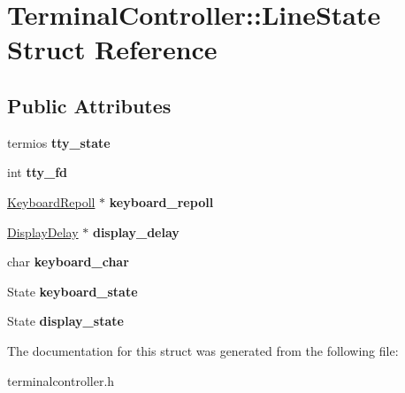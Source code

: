 \hypertarget{structTerminalController_1_1LineState}{
\section{TerminalController::LineState Struct Reference}
\label{structTerminalController_1_1LineState}
}
\subsection*{Public Attributes}
\begin{DoxyCompactItemize}
\item 
\hypertarget{structTerminalController_1_1LineState_aa3d5368683cf0c21a6eb4d995a7a0d76}{
termios {\bfseries tty\_\-state}}
\label{structTerminalController_1_1LineState_aa3d5368683cf0c21a6eb4d995a7a0d76}

\item 
\hypertarget{structTerminalController_1_1LineState_aa6ed05eb943bb04a902a0c10cbb4c98b}{
int {\bfseries tty\_\-fd}}
\label{structTerminalController_1_1LineState_aa6ed05eb943bb04a902a0c10cbb4c98b}

\item 
\hypertarget{structTerminalController_1_1LineState_a88e46fd3d83878ce3d92d85a245796e8}{
\hyperlink{classTerminalController_1_1KeyboardRepoll}{KeyboardRepoll} $\ast$ {\bfseries keyboard\_\-repoll}}
\label{structTerminalController_1_1LineState_a88e46fd3d83878ce3d92d85a245796e8}

\item 
\hypertarget{structTerminalController_1_1LineState_a478b3bef98dd7e10aa79f71d88c29c64}{
\hyperlink{classTerminalController_1_1DisplayDelay}{DisplayDelay} $\ast$ {\bfseries display\_\-delay}}
\label{structTerminalController_1_1LineState_a478b3bef98dd7e10aa79f71d88c29c64}

\item 
\hypertarget{structTerminalController_1_1LineState_a6f28f0977415d283fb1cf51935fc4388}{
char {\bfseries keyboard\_\-char}}
\label{structTerminalController_1_1LineState_a6f28f0977415d283fb1cf51935fc4388}

\item 
\hypertarget{structTerminalController_1_1LineState_aa6e0e680ed2f77007c03f870a21b6bb0}{
State {\bfseries keyboard\_\-state}}
\label{structTerminalController_1_1LineState_aa6e0e680ed2f77007c03f870a21b6bb0}

\item 
\hypertarget{structTerminalController_1_1LineState_aa477be2fd952f2218d951ff2ee5c63db}{
State {\bfseries display\_\-state}}
\label{structTerminalController_1_1LineState_aa477be2fd952f2218d951ff2ee5c63db}

\end{DoxyCompactItemize}


The documentation for this struct was generated from the following file:\begin{DoxyCompactItemize}
\item 
terminalcontroller.h\end{DoxyCompactItemize}
